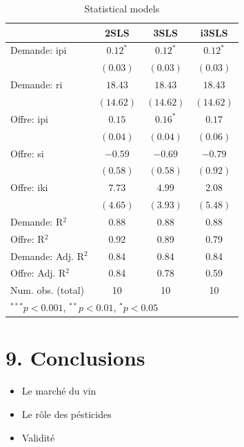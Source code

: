 \documentclass[11pt,]{article}
\providecommand{\tightlist}{%
  \setlength{\itemsep}{0pt}\setlength{\parskip}{0pt}}
\begin{document}
\begin{table}[!htbp]
\begin{center}
\begin{tabular}{l c c c }
\hline
 & 2SLS & 3SLS & i3SLS \\
\hline
Demande: ipi        & $0.12^{*}$ & $0.12^{*}$ & $0.12^{*}$ \\
                    & $(0.03)$   & $(0.03)$   & $(0.03)$   \\
Demande: ri         & $18.43$    & $18.43$    & $18.43$    \\
                    & $(14.62)$  & $(14.62)$  & $(14.62)$  \\
Offre: ipi          & $0.15$     & $0.16^{*}$ & $0.17$     \\
                    & $(0.04)$   & $(0.04)$   & $(0.06)$   \\
Offre: si           & $-0.59$    & $-0.69$    & $-0.79$    \\
                    & $(0.58)$   & $(0.58)$   & $(0.92)$   \\
Offre: iki          & $7.73$     & $4.99$     & $2.08$     \\
                    & $(4.65)$   & $(3.93)$   & $(5.48)$   \\
\hline
Demande: R$^2$      & 0.88       & 0.88       & 0.88       \\
Offre: R$^2$        & 0.92       & 0.89       & 0.79       \\
Demande: Adj. R$^2$ & 0.84       & 0.84       & 0.84       \\
Offre: Adj. R$^2$   & 0.84       & 0.78       & 0.59       \\
Num. obs. (total)   & 10         & 10         & 10         \\
\hline
\multicolumn{4}{l}{\scriptsize{$^{***}p<0.001$, $^{**}p<0.01$, $^*p<0.05$}}
\end{tabular}
\caption{Statistical models}
\label{table : 2sls, 3sls and fiml cluster 3}
\end{center}
\end{table}

\FloatBarrier

\hypertarget{conclusions}{%
\section{9. Conclusions}\label{conclusions}}

\begin{itemize}
\tightlist
\item
  Le marché du vin
\item
  Le rôle des pésticides\\
\item
  Validité
\end{itemize}
\end{document}
